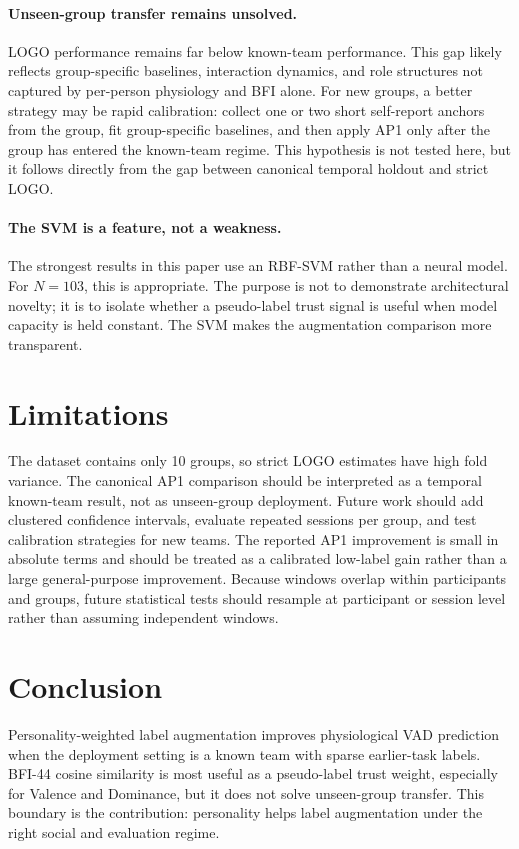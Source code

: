 \documentclass[sigconf,review,anonymous]{acmart}
\begin{document}
\paragraph{Unseen-group transfer remains unsolved.}
LOGO performance remains far below known-team performance.
This gap likely reflects group-specific baselines, interaction dynamics, and
role structures not captured by per-person physiology and BFI alone.
For new groups, a better strategy may be rapid calibration: collect one or two
short self-report anchors from the group, fit group-specific baselines, and
then apply AP1 only after the group has entered the known-team regime.
This hypothesis is not tested here, but it follows directly from the gap
between canonical temporal holdout and strict LOGO.

\paragraph{The SVM is a feature, not a weakness.}
The strongest results in this paper use an RBF-SVM rather than a neural model.
For $N=103$, this is appropriate.
The purpose is not to demonstrate architectural novelty; it is to isolate
whether a pseudo-label trust signal is useful when model capacity is held
constant.
The SVM makes the augmentation comparison more transparent.

\section{Limitations}
\label{sec:limitations}

The dataset contains only 10 groups, so strict LOGO estimates have high fold
variance.
The canonical AP1 comparison should be interpreted as a temporal known-team
result, not as unseen-group deployment.
Future work should add clustered confidence intervals, evaluate repeated
sessions per group, and test calibration strategies for new teams.
The reported AP1 improvement is small in absolute terms and should be treated
as a calibrated low-label gain rather than a large general-purpose improvement.
Because windows overlap within participants and groups, future statistical
tests should resample at participant or session level rather than assuming
independent windows.

\section{Conclusion}
\label{sec:conclusion}

Personality-weighted label augmentation improves physiological VAD prediction
when the deployment setting is a known team with sparse earlier-task labels.
BFI-44 cosine similarity is most useful as a pseudo-label trust weight,
especially for Valence and Dominance, but it does not solve unseen-group
transfer.
This boundary is the contribution: personality helps label augmentation under
the right social and evaluation regime.



\end{document}
